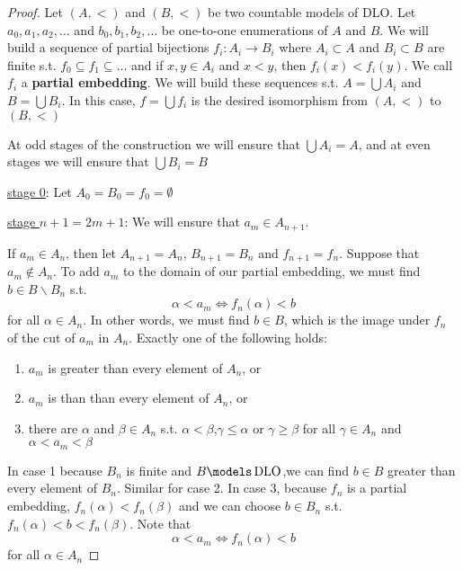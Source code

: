 \documentclass[11pt]{article}
\begin{document}
\begin{proof}
Let \((A,<)\) and \((B,<)\) be two countable models of DLO. Let
\(a_0,a_1,a_2,\dots\) and \(b_0,b_1,b_2,\dots\) be one-to-one enumerations
of \(A\) and \(B\). We will build a sequence of partial bijections
\(f_i:A_i\to B_i\) where \(A_i\subset A\) and \(B_i\subset B\) are finite
s.t. \(f_0\subseteq f_1\subseteq\dots\) and if \(x,y\in A_i\) and \(x<y\),
then \(f_i(x)<f_i(y)\). We call \(f_i\) a \textbf{partial embedding}. We will build
these sequences s.t. \(A=\bigcup A_i\) and \(B=\bigcup B_i\). In this case,
\(f=\bigcup f_i\) is the desired isomorphism from \((A,<)\) to \((B,<)\)

At odd stages of the construction we will ensure that \(\bigcup A_i=A\), and
at even stages we will ensure that \(\bigcup B_i=B\)

\uline{stage 0}: Let \(A_0=B_0=f_0=\emptyset\)

\uline{stage \(n+1=2m+1\)}: We will ensure that \(a_m\in A_{n+1}\).

If \(a_m\in A_n\), then let \(A_{n+1}=A_n\), \(B_{n+1}=B_n\) and
\(f_{n+1}=f_n\). Suppose that \(a_m\not\in A_n\). To add \(a_m\) to the
domain of our partial embedding, we must find \(b\in B\backslash B_n\) s.t.
\begin{equation*}
\alpha<a_m\Leftrightarrow f_n(\alpha)<b
\end{equation*}
for all \(\alpha\in A_n\). In other words, we must find \(b\in B\), which is
the image under \(f_n\) of the cut of \(a_m\) in \(A_n\). Exactly one of the
following holds:
\begin{enumerate}
\item \(a_m\) is greater than every element of \(A_n\), or
\item \(a_m\) is than than every element of \(A_n\), or
\item there are \(\alpha\) and \(\beta\in A_n\) s.t. \(\alpha<\beta\),\(\gamma\le\alpha\) or
\(\gamma\ge\beta\) for all \(\gamma\in A_n\) and \(\alpha<a_m<\beta\)
\end{enumerate}


In case 1 because \(B_n\) is finite and \(B\models\DLO\),we can find 
\(b\in B\) greater than every element of \(B_n\). Similar for case 2. In
case 3, because \(f_n\) is a partial embedding, \(f_n(\alpha)<f_n(\beta)\) and we can
choose \(b\in B_n\) s.t. \(f_n(\alpha)<b<f_n(\beta)\). Note that 
\begin{equation*}
\alpha<a_m\Leftrightarrow f_n(\alpha)<b
\end{equation*}
for all \(\alpha\in A_n\)


\end{proof}
\end{document}

